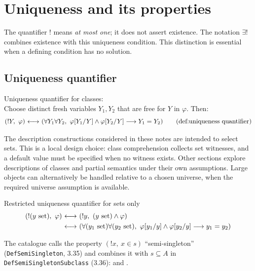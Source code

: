 \def\topic{Uniqueness quantifier}

\section{Uniqueness and its properties}
The quantifier $!$ means \emph{at most one}; it does not assert existence.
The notation $\exists!$ combines existence with this uniqueness condition.
This distinction is essential when a defining condition has no solution.
\subsection{Uniqueness quantifier}
\begin{definition}
Uniqueness quantifier for classes:\\
Choose distinct fresh variables $Y_1,Y_2$ that are free for $Y$ in
$\varphi$. Then:
\[
(!Y,\ \varphi)\iff (\forall Y_1\forall Y_2,\ \varphi[Y_1/Y]\land\varphi[Y_2/Y]\implies Y_1=Y_2)
\labeltagd{def}{uniqueness quantifier}
\]
\end{definition}
\begin{note}
The description constructions considered in these notes are intended to
select sets. This is a local design choice: class comprehension collects
set witnesses, and a default value must be specified when no witness
exists. Other sections explore descriptions of classes and partial
semantics under their own assumptions. Large objects can alternatively be
handled relative to a chosen universe, when the required universe
assumption is available.
\end{note}
\begin{definition}
Restricted uniqueness quantifier for sets only
\begin{align*}
(!(y\set),\ \varphi)
&\iff
(!y,\ (y\set)\land\varphi)
\\
&\iff
(\forall (y_1\set)\forall (y_2\set),\ \varphi[y_1/y]\land\varphi[y_2/y]\implies y_1=y_2)
\label{def:restricted uniqueness quantifier}
\end{align*}
\end{definition}

\begin{note}
The catalogue calls the property $(!x,\ x\in s)$ ``semi-singleton''
(\texttt{DefSemiSingleton}, 3.35) and combines it with $s\subseteq A$ in
\texttt{DefSemiSingletonSubclass} (3.36):  and
.
\end{note}

